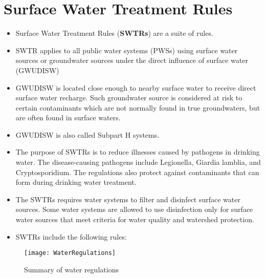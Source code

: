 \section{Surface Water Treatment Rules}
\begin{itemize}
\item Surface Water Treatment Rules (\textbf{SWTRs}) are a suite of rules.
\item  SWTR applies to all public water systems (PWSs) using surface water sources or groundwater sources under the direct influence of surface water (GWUDISW) 
\item  GWUDISW is located close enough to nearby surface water to receive direct surface water recharge. Such groundwater source is considered at risk to certain contaminants which are not normally found in true groundwaters, but are often found in surface waters.
\item GWUDISW is also called Subpart H systems. 
\item The purpose of SWTRs is to reduce illnesses caused by pathogens in drinking water. The disease-causing pathogens include Legionella, Giardia lamblia, and Cryptosporidium.  The regulations also protect against contaminants that can form during drinking water treatment.
\item The SWTRs requires water systems to filter and disinfect surface water sources. Some water systems are allowed to use disinfection only for surface water sources that meet criteria for water quality and watershed protection.
\item SWTRs include the following rules:
\end{itemize}

\begin{figure}[H]
\begin{center}
\texttt{[image: WaterRegulations]}
\caption{Summary of water regulations}
\end{center}
\end{figure}

